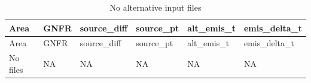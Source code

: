 \documentclass[
]{article}
\begin{document}
\begin{longtable}[]{@{}
  >{\centering\arraybackslash}p{}
  >{\centering\arraybackslash}p{}
  >{\centering\arraybackslash}p{}
  >{\centering\arraybackslash}p{}
  >{\centering\arraybackslash}p{}
  >{\centering\arraybackslash}p{}@{}}
\caption{No alternative input files}\tabularnewline
\toprule\noalign{}
\begin{minipage}[b]{\linewidth}\centering
Area
\end{minipage} & \begin{minipage}[b]{\linewidth}\centering
GNFR
\end{minipage} & \begin{minipage}[b]{\linewidth}\centering
source\_diff
\end{minipage} & \begin{minipage}[b]{\linewidth}\centering
source\_pt
\end{minipage} & \begin{minipage}[b]{\linewidth}\centering
alt\_emis\_t
\end{minipage} & \begin{minipage}[b]{\linewidth}\centering
emis\_delta\_t
\end{minipage} \\
\midrule\noalign{}
\endfirsthead
\toprule\noalign{}
\begin{minipage}[b]{\linewidth}\centering
Area
\end{minipage} & \begin{minipage}[b]{\linewidth}\centering
GNFR
\end{minipage} & \begin{minipage}[b]{\linewidth}\centering
source\_diff
\end{minipage} & \begin{minipage}[b]{\linewidth}\centering
source\_pt
\end{minipage} & \begin{minipage}[b]{\linewidth}\centering
alt\_emis\_t
\end{minipage} & \begin{minipage}[b]{\linewidth}\centering
emis\_delta\_t
\end{minipage} \\
\midrule\noalign{}
\endhead
\bottomrule\noalign{}
\endlastfoot
No files & NA & NA & NA & NA & NA \\
\end{longtable}
\end{document}
